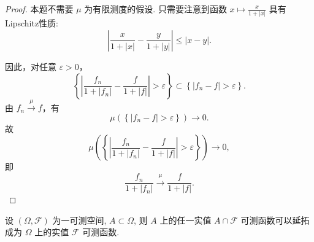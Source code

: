         \begin{proof}
            本题不需要 $\mu$ 为有限测度的假设. 只需要注意到函数 $x\mapsto \displaystyle\frac{x}{1+|x|}$ 具有 Lipschitz性质: 
            \[
                \left|\frac{x}{1+|x|}-\frac{y}{1+|y|}\right|\le |x-y|.
            \]

            因此，对任意 $\varepsilon>0$，
            \[
            \left\{
            \left|
            \frac{f_n}{1+|f_n|}
            -
            \frac{f}{1+|f|}
            \right|>\varepsilon
            \right\}
            \subset
            \left\{|f_n-f|>\varepsilon\right\}.
            \]
            由 $f_n\stackrel{\mu}{\longrightarrow}f$，有
            \[
            \mu\left(\left\{|f_n-f|>\varepsilon\right\}\right)\to 0.
            \]
            故
            \[
            \mu\left(
            \left\{
            \left|
            \frac{f_n}{1+|f_n|}
            -
            \frac{f}{1+|f|}
            \right|>\varepsilon
            \right\}
            \right)\to0,
            \]
            即
            \[
            \frac{f_n}{1+|f_n|}
            \stackrel{\mu}{\longrightarrow}
            \frac{f}{1+|f|}.
            \]
        \end{proof}
        \begin{6}
            设 $(\Omega,\mathcal{F})$ 为一可测空间, 
            $A\subset \Omega$, 
            则 $A$ 上的任一实值 $A\cap\mathcal{F}$ 可测函数可以延拓成为 $\Omega$ 上的实值 $\mathcal{F}$ 可测函数. 
        \end{6}
